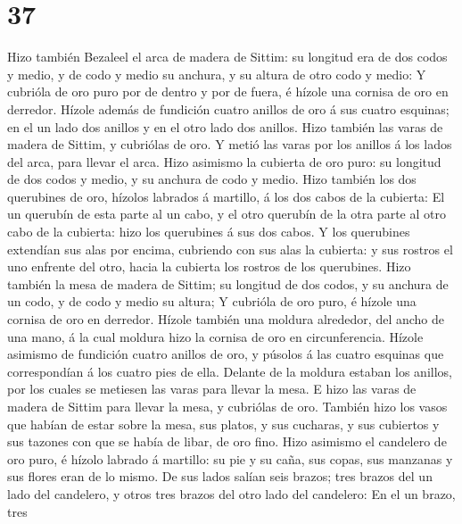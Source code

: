 \hypertarget{section-36}{%
\section{37}\label{section-36}}

 Hizo también Bezaleel el arca de madera de Sittim: su
longitud era de dos codos y medio, y de codo y medio su anchura, y su
altura de otro codo y medio:  Y cubrióla de oro puro por de
dentro y por de fuera, é hízole una cornisa de oro en derredor.
 Hízole además de fundición cuatro anillos de oro á sus
cuatro esquinas; en el un lado dos anillos y en el otro lado dos
anillos.  Hizo también las varas de madera de Sittim, y
cubriólas de oro.  Y metió las varas por los anillos á los
lados del arca, para llevar el arca.  Hizo asimismo la
cubierta de oro puro: su longitud de dos codos y medio, y su anchura de
codo y medio.  Hizo también los dos querubines de oro,
hízolos labrados á martillo, á los dos cabos de la cubierta:
 El un querubín de esta parte al un cabo, y el otro querubín
de la otra parte al otro cabo de la cubierta: hizo los querubines á sus
dos cabos.  Y los querubines extendían sus alas por encima,
cubriendo con sus alas la cubierta: y sus rostros el uno enfrente del
otro, hacia la cubierta los rostros de los querubines. 
Hizo también la mesa de madera de Sittim; su longitud de dos codos, y su
anchura de un codo, y de codo y medio su altura;  Y
cubrióla de oro puro, é hízole una cornisa de oro en derredor.
 Hízole también una moldura alrededor, del ancho de una
mano, á la cual moldura hizo la cornisa de oro en circunferencia.
 Hízole asimismo de fundición cuatro anillos de oro, y
púsolos á las cuatro esquinas que correspondían á los cuatro pies de
ella.  Delante de la moldura estaban los anillos, por los
cuales se metiesen las varas para llevar la mesa.  E hizo
las varas de madera de Sittim para llevar la mesa, y cubriólas de oro.
 También hizo los vasos que habían de estar sobre la mesa,
sus platos, y sus cucharas, y sus cubiertos y sus tazones con que se
había de libar, de oro fino.  Hizo asimismo el candelero de
oro puro, é hízolo labrado á martillo: su pie y su caña, sus copas, sus
manzanas y sus flores eran de lo mismo.  De sus lados
salían seis brazos; tres brazos del un lado del candelero, y otros tres
brazos del otro lado del candelero:  En el un brazo, tres
